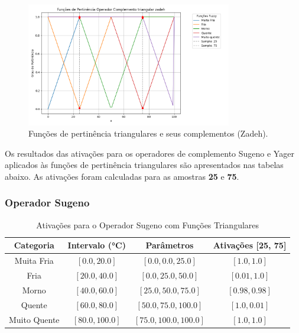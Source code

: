\documentclass[a4paper,12pt]{article}
\begin{document}
\begin{figure}[H]
    \centering
    \includegraphics[width=0.8\textwidth]{img/funções_de_pertinência_operador_complemento_triangular_zadeh_fuzzificado.png}
    \caption{Funções de pertinência triangulares e seus complementos (Zadeh).}
    \label{fig:complemento_zadeh_triangular}
\end{figure}
Os resultados das ativações para os operadores de complemento Sugeno e Yager aplicados às funções de pertinência triangulares são apresentados nas tabelas abaixo. As ativações foram calculadas para as amostras \textbf{25} e \textbf{75}.

\subsubsection{Operador Sugeno}

\begin{table}[H]
\centering
\caption{Ativações para o Operador Sugeno com Funções Triangulares}
\begin{tabular}{|c|c|c|c|}
\hline
\textbf{Categoria}    & \textbf{Intervalo (°C)} & \textbf{Parâmetros}       & \textbf{Ativações [25, 75]} \\ \hline
Muita Fria            & $[0.0, 20.0]$          & $[0.0, 0.0, 25.0]$        & $[1.0, 1.0]$               \\ \hline
Fria                  & $[20.0, 40.0]$         & $[0.0, 25.0, 50.0]$       & $[0.01, 1.0]$              \\ \hline
Morno                 & $[40.0, 60.0]$         & $[25.0, 50.0, 75.0]$      & $[0.98, 0.98]$             \\ \hline
Quente                & $[60.0, 80.0]$         & $[50.0, 75.0, 100.0]$     & $[1.0, 0.01]$              \\ \hline
Muito Quente          & $[80.0, 100.0]$        & $[75.0, 100.0, 100.0]$    & $[1.0, 1.0]$               \\ \hline
\end{tabular}
\end{table}
\end{document}
